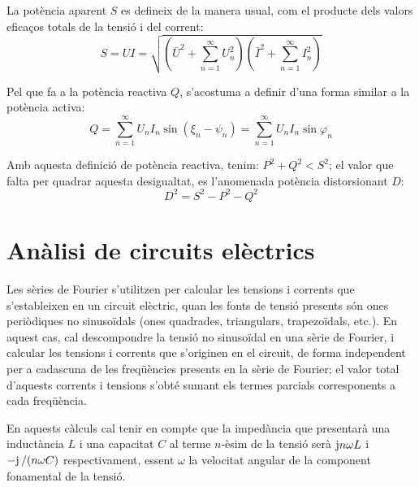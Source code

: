 La potència aparent $S$ es defineix de la manera usual, com el
producte dels valors eficaços totals de la tensió i del corrent:
\begin{equation}
    S = U I = \sqrt{ \left(\bar{U}^2 + \sum_{n=1}^{\infty}U^2_n\right)
    \left(\bar{I}^2 + \sum_{n=1}^{\infty}I^2_n\right) }
\end{equation}

Pel que fa  a la potència reactiva $Q$, s'acostuma  a definir d'una
forma similar a la potència activa:
\begin{equation}
    Q = \sum_{n=1}^\infty U_n I_n
    \sin(\xi_n-\psi_n) =  \sum_{n=1}^\infty U_n I_n
    \sin \varphi_n
\end{equation}

Amb aquesta definició de potència reactiva, tenim: $P^2+Q^2 < S^2$;
el valor que falta per quadrar aquesta desigualtat, es l'anomenada
potència distorsionant $D$:
\begin{equation}
    D^2 = S^2 - P^2 - Q^2
\end{equation}

\section{Anàlisi de circuits elèctrics}

Les sèries de Fourier s'utilitzen per calcular les tensions i
corrents que s'estableixen en un circuit elèctric, quan les fonts de
tensió presents  són ones periòdiques no sinusoïdals (ones
quadrades, triangulars, trapezoïdals, etc.). En aquest cas, cal
descompondre la tensió no sinusoïdal en una sèrie de Fourier, i
calcular les tensions i corrents que s'originen en el circuit, de
forma independent per a cadascuna de les freqüències presents en la
sèrie de Fourier; el valor total d'aquests corrents i tensions
s'obté sumant els termes parcials corresponents a cada freqüència.

En aquests càlculs cal tenir en compte que la impedància que
presentarà una inductància $L$ i una capacitat $C$ al terme
$n$-èsim de la tensió serà $\mathrm{j} n \omega L$ i $-\mathrm{j}\,/(n\omega C)$
respectivament, essent $\omega$ la velocitat angular de la component
fonamental de la tensió.

